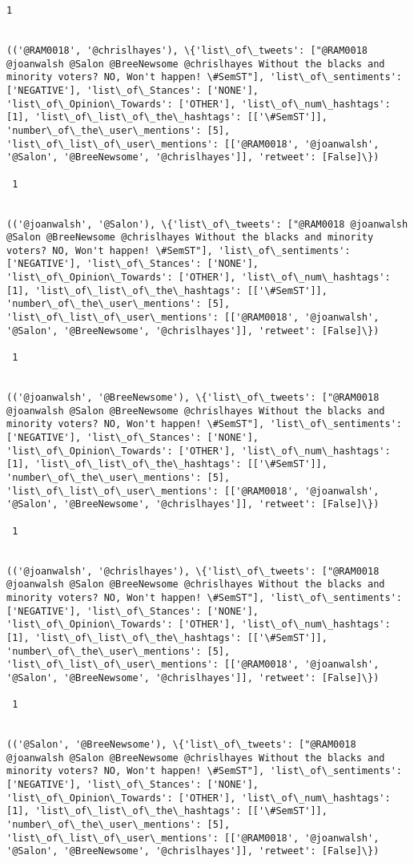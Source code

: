 \documentclass[11pt]{article}
\begin{document}
\begin{Verbatim}[commandchars=\\\{\}]
 1
 

(('@RAM0018', '@chrislhayes'), \{'list\_of\_tweets': ["@RAM0018 @joanwalsh @Salon @BreeNewsome @chrislhayes Without the blacks and minority voters? NO, Won't happen! \#SemST"], 'list\_of\_sentiments': ['NEGATIVE'], 'list\_of\_Stances': ['NONE'], 'list\_of\_Opinion\_Towards': ['OTHER'], 'list\_of\_num\_hashtags': [1], 'list\_of\_list\_of\_the\_hashtags': [['\#SemST']], 'number\_of\_the\_user\_mentions': [5], 'list\_of\_list\_of\_user\_mentions': [['@RAM0018', '@joanwalsh', '@Salon', '@BreeNewsome', '@chrislhayes']], 'retweet': [False]\})

 1
 

(('@joanwalsh', '@Salon'), \{'list\_of\_tweets': ["@RAM0018 @joanwalsh @Salon @BreeNewsome @chrislhayes Without the blacks and minority voters? NO, Won't happen! \#SemST"], 'list\_of\_sentiments': ['NEGATIVE'], 'list\_of\_Stances': ['NONE'], 'list\_of\_Opinion\_Towards': ['OTHER'], 'list\_of\_num\_hashtags': [1], 'list\_of\_list\_of\_the\_hashtags': [['\#SemST']], 'number\_of\_the\_user\_mentions': [5], 'list\_of\_list\_of\_user\_mentions': [['@RAM0018', '@joanwalsh', '@Salon', '@BreeNewsome', '@chrislhayes']], 'retweet': [False]\})

 1
 

(('@joanwalsh', '@BreeNewsome'), \{'list\_of\_tweets': ["@RAM0018 @joanwalsh @Salon @BreeNewsome @chrislhayes Without the blacks and minority voters? NO, Won't happen! \#SemST"], 'list\_of\_sentiments': ['NEGATIVE'], 'list\_of\_Stances': ['NONE'], 'list\_of\_Opinion\_Towards': ['OTHER'], 'list\_of\_num\_hashtags': [1], 'list\_of\_list\_of\_the\_hashtags': [['\#SemST']], 'number\_of\_the\_user\_mentions': [5], 'list\_of\_list\_of\_user\_mentions': [['@RAM0018', '@joanwalsh', '@Salon', '@BreeNewsome', '@chrislhayes']], 'retweet': [False]\})

 1
 

(('@joanwalsh', '@chrislhayes'), \{'list\_of\_tweets': ["@RAM0018 @joanwalsh @Salon @BreeNewsome @chrislhayes Without the blacks and minority voters? NO, Won't happen! \#SemST"], 'list\_of\_sentiments': ['NEGATIVE'], 'list\_of\_Stances': ['NONE'], 'list\_of\_Opinion\_Towards': ['OTHER'], 'list\_of\_num\_hashtags': [1], 'list\_of\_list\_of\_the\_hashtags': [['\#SemST']], 'number\_of\_the\_user\_mentions': [5], 'list\_of\_list\_of\_user\_mentions': [['@RAM0018', '@joanwalsh', '@Salon', '@BreeNewsome', '@chrislhayes']], 'retweet': [False]\})

 1
 

(('@Salon', '@BreeNewsome'), \{'list\_of\_tweets': ["@RAM0018 @joanwalsh @Salon @BreeNewsome @chrislhayes Without the blacks and minority voters? NO, Won't happen! \#SemST"], 'list\_of\_sentiments': ['NEGATIVE'], 'list\_of\_Stances': ['NONE'], 'list\_of\_Opinion\_Towards': ['OTHER'], 'list\_of\_num\_hashtags': [1], 'list\_of\_list\_of\_the\_hashtags': [['\#SemST']], 'number\_of\_the\_user\_mentions': [5], 'list\_of\_list\_of\_user\_mentions': [['@RAM0018', '@joanwalsh', '@Salon', '@BreeNewsome', '@chrislhayes']], 'retweet': [False]\})


\end{Verbatim}
\end{document}
